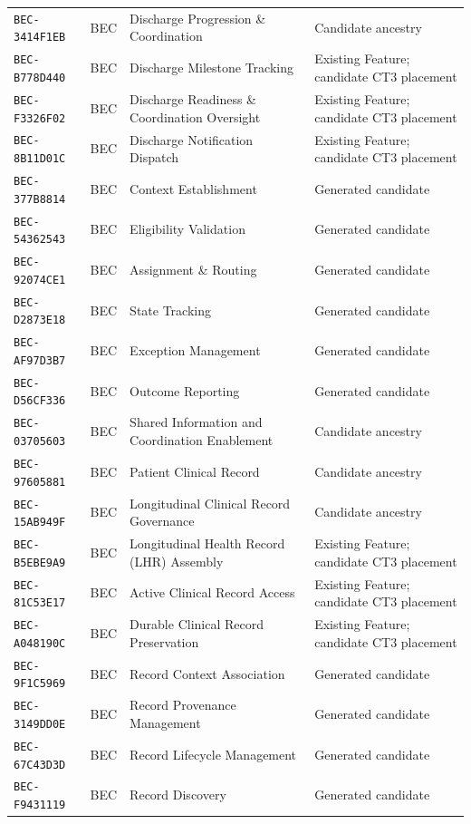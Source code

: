 \documentclass[11pt,a4paper,openany]{book}
\begin{document}
\begin{longtable}{@{}p{.19\linewidth}p{.12\linewidth}p{.39\linewidth}p{.24\linewidth}@{}}
\texttt{BEC-3414F1EB} & BEC & Discharge Progression \& Coordination & Candidate ancestry \\
\texttt{BEC-B778D440} & BEC & Discharge Milestone Tracking & Existing Feature; candidate CT3 placement \\
\texttt{BEC-F3326F02} & BEC & Discharge Readiness \& Coordination Oversight & Existing Feature; candidate CT3 placement \\
\texttt{BEC-8B11D01C} & BEC & Discharge Notification Dispatch & Existing Feature; candidate CT3 placement \\
\texttt{BEC-377B8814} & BEC & Context Establishment & Generated candidate \\
\texttt{BEC-54362543} & BEC & Eligibility Validation & Generated candidate \\
\texttt{BEC-92074CE1} & BEC & Assignment \& Routing & Generated candidate \\
\texttt{BEC-D2873E18} & BEC & State Tracking & Generated candidate \\
\texttt{BEC-AF97D3B7} & BEC & Exception Management & Generated candidate \\
\texttt{BEC-D56CF336} & BEC & Outcome Reporting & Generated candidate \\
\texttt{BEC-03705603} & BEC & Shared Information and Coordination Enablement & Candidate ancestry \\
\texttt{BEC-97605881} & BEC & Patient Clinical Record & Candidate ancestry \\
\texttt{BEC-15AB949F} & BEC & Longitudinal Clinical Record Governance & Candidate ancestry \\
\texttt{BEC-B5EBE9A9} & BEC & Longitudinal Health Record (LHR) Assembly & Existing Feature; candidate CT3 placement \\
\texttt{BEC-81C53E17} & BEC & Active Clinical Record Access & Existing Feature; candidate CT3 placement \\
\texttt{BEC-A048190C} & BEC & Durable Clinical Record Preservation & Existing Feature; candidate CT3 placement \\
\texttt{BEC-9F1C5969} & BEC & Record Context Association & Generated candidate \\
\texttt{BEC-3149DD0E} & BEC & Record Provenance Management & Generated candidate \\
\texttt{BEC-67C43D3D} & BEC & Record Lifecycle Management & Generated candidate \\
\texttt{BEC-F9431119} & BEC & Record Discovery & Generated candidate \\

\end{longtable}
\end{document}
